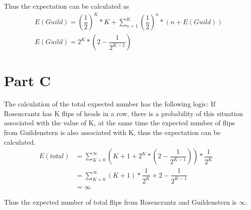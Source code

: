 \documentclass[11pt]{article}
\begin{document}
Thus the expectation can be calculated as 
\begin{align*}
& E(Guild)={(\dfrac{1}{2})}^{K}*K + \sum\limits_{n=1}^{K} {(\dfrac{1}{2})}^{n}*(n+E(Guild)) \\
& E(Guild)=2^K*(2-\dfrac{1}{2^{K-1}})
\end{align*}

\section{Part C}
The calculation of the total expected number has the following logic: If Rosencrantz has K flips of heads in a row, there is a probability of this situation associated with the value of K, at the same time the expected number of flips from Guildenstern is also associated with K, thus the expectation can be calculated. 
\begin{align*}
E(total) 
& = \sum\limits_{K=0}^{\infty} (K+1+2^K*(2-\dfrac{1}{2^{K-1}}))*\dfrac{1}{2^K} \\
& = \sum\limits_{K=0}^{\infty} (K+1)*\dfrac{1}{2^K} +2-\dfrac{1}{2^{K-1}} \\
& = \infty
\end{align*}

Thus the expected number of total flips from Rosencrantz and Guildenstern is $\infty$.
\end{document}
